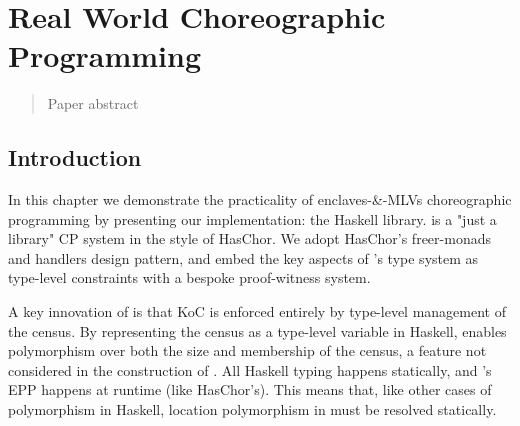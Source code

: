 \chapter{Real World Choreographic Programming}
\label{sec:multichor}

\begin{quote}
Paper abstract
\end{quote}


\section{Introduction}
In this chapter we demonstrate the practicality of enclaves-\&-MLVs choreographic programming
by presenting our implementation:
the \MultiChor Haskell library.
\MultiChor is a "just a library" CP system in the style of HasChor.
We adopt HasChor's freer-monads and handlers design pattern,
and embed the key aspects of \HLSCentral's type system as type-level constraints with a bespoke proof-witness system.

A key innovation of \HLSCentral is that KoC is enforced entirely
by type-level management of the census.
By representing the census as a type-level variable in Haskell,
\MultiChor enables polymorphism over both the size and membership of the census,
a feature not considered in the construction of \HLSCentral.
All Haskell typing happens statically, and \MultiChor's EPP happens at runtime (like HasChor's).
This means that, like other cases of polymorphism in Haskell, location polymorphism in \MultiChor must be resolved statically.


